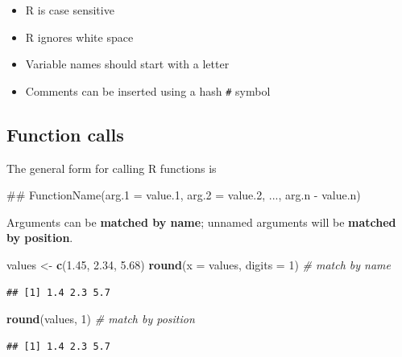 \documentclass[]{book}
\newenvironment{Shaded}{\begin{snugshade}}{\end{snugshade}}
\newcommand{\KeywordTok}[1]{\textcolor[rgb]{0.13,0.29,0.53}{\textbf{#1}}}
\newcommand{\DataTypeTok}[1]{\textcolor[rgb]{0.13,0.29,0.53}{#1}}
\newcommand{\DecValTok}[1]{\textcolor[rgb]{0.00,0.00,0.81}{#1}}
\newcommand{\FloatTok}[1]{\textcolor[rgb]{0.00,0.00,0.81}{#1}}
\newcommand{\StringTok}[1]{\textcolor[rgb]{0.31,0.60,0.02}{#1}}
\newcommand{\CommentTok}[1]{\textcolor[rgb]{0.56,0.35,0.01}{\textit{#1}}}
\newcommand{\NormalTok}[1]{#1}
\providecommand{\tightlist}{%
  \setlength{\itemsep}{0pt}\setlength{\parskip}{0pt}}
\begin{document}
\begin{itemize}
\tightlist
\item
  R is case sensitive
\item
  R ignores white space
\item
  Variable names should start with a letter
\item
  Comments can be inserted using a hash \texttt{\#} symbol
\end{itemize}

\subsection{Function calls}\label{function-calls}

The general form for calling R functions is

\begin{Shaded}
\begin{Highlighting}[]
\NormalTok{## FunctionName(arg.1 = value.1, arg.2 = value.2, ..., arg.n - value.n)}
\end{Highlighting}
\end{Shaded}

Arguments can be \textbf{matched by name}; unnamed arguments will be
\textbf{matched by position}.

\begin{Shaded}
\begin{Highlighting}[]
\NormalTok{values <-}\StringTok{ }\KeywordTok{c}\NormalTok{(}\FloatTok{1.45}\NormalTok{, }\FloatTok{2.34}\NormalTok{, }\FloatTok{5.68}\NormalTok{)}
\KeywordTok{round}\NormalTok{(}\DataTypeTok{x =}\NormalTok{ values, }\DataTypeTok{digits =} \DecValTok{1}\NormalTok{) }\CommentTok{# match by name}
\end{Highlighting}
\end{Shaded}

\begin{verbatim}
## [1] 1.4 2.3 5.7
\end{verbatim}

\begin{Shaded}
\begin{Highlighting}[]
\KeywordTok{round}\NormalTok{(values, }\DecValTok{1}\NormalTok{) }\CommentTok{# match by position}
\end{Highlighting}
\end{Shaded}

\begin{verbatim}
## [1] 1.4 2.3 5.7
\end{verbatim}
\end{document}
